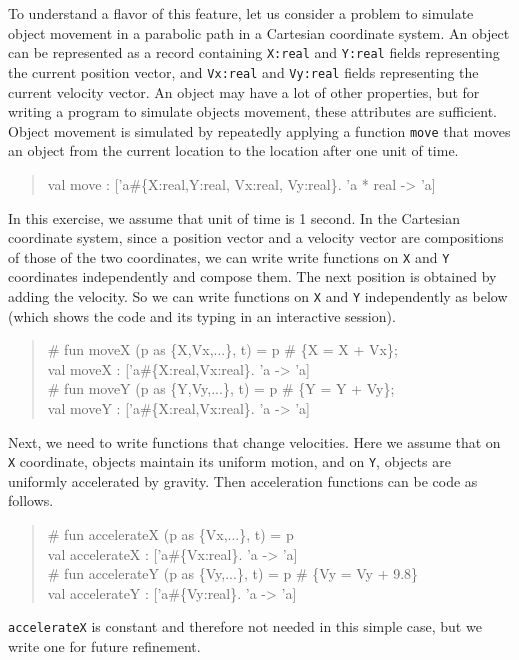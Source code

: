 \documentclass{jbook}
\newenvironment{program}{\begin{quote}\begin{tt}}%
                        {\end{tt}\end{quote}}
\begin{document}
	To understand a flavor of this feature, let us consider a
problem to simulate object movement in a parabolic path in a Cartesian
coordinate system.
	An object can be represented as a record containing
{\tt X:real} and {\tt Y:real} fields representing the current
position vector, and {\tt Vx:real} and {\tt Vy:real} fields representing
the current velocity vector.
	An object may have a lot of other properties, but for writing
a program to simulate objects movement, these attributes are sufficient.
	Object movement is simulated by repeatedly applying a function
{\tt move} that moves an object from the current location to the
location after one unit of time.
\begin{program}
val move : ['a\#\{X:real,Y:real, Vx:real, Vy:real\}. 'a * real -> 'a]
\end{program}
	In this exercise, we assume that unit of time is 1 second.
	In the Cartesian coordinate system, since a position vector and
a velocity vector are compositions of those of the two coordinates, 
we can write write functions on {\tt X} and {\tt Y} coordinates
independently and compose them.
	The next position is obtained by adding the velocity.
	So we can write functions on {\tt X} and {\tt Y} independently
as below (which shows the code and its typing in an interactive
session).
\begin{program}
\# fun moveX (p as \{X,Vx,...\}, t) = p \# \{X = X + Vx\};\\
val moveX : ['a\#\{X:real,Vx:real\}. 'a -> 'a]\\
\# fun moveY (p as \{Y,Vy,...\}, t) = p \# \{Y = Y + Vy\};\\
val moveY : ['a\#\{X:real,Vx:real\}. 'a -> 'a]
\end{program}
	Next, we need to write functions that change velocities.
	Here we assume that on {\tt X} coordinate, objects maintain its
uniform motion, and on {\tt Y}, objects are uniformly accelerated by
gravity.
	Then acceleration functions can be code as follows.
\begin{tt}\begin{quote}
\# fun accelerateX (p as \{Vx,...\}, t) = p\\
val accelerateX : ['a\#\{Vx:real\}. 'a -> 'a]\\
\# fun accelerateY (p as \{Vy,...\}, t) = p \# \{Vy = Vy + 9.8\}\\
val accelerateY : ['a\#\{Vy:real\}. 'a -> 'a]\\
\end{quote}\end{tt}
	{\tt accelerateX} is constant and therefore not needed in this
simple case, but we write one for future refinement.
	
\end{document}

